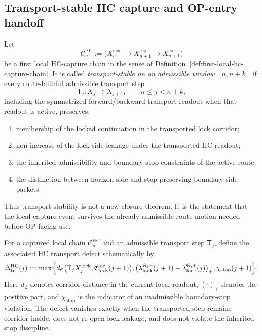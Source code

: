 \subsection{Transport-stable HC capture and OP-entry handoff}
\label{subsec:transport-stable-hc-capture-op-entry-handoff}

\begin{definition}
\label{def:transport-stable-hc-capture-chain}
Let
\[
  \mathcal C_{n}^{\mathrm{HC}}
  :=
  \bigl(
    X_n^{\mathrm{near}}
    \to
    X_{n+1}^{\mathrm{rep}}
    \to
    X_{n+1}^{\mathrm{lock}}
  \bigr)
\]
be a first local HC-capture chain in the sense of Definition~\ref{def:first-local-hc-capture-chain}.  It is called
\emph{transport-stable on an admissible window} $[n,n+k]$ if every route-faithful admissible transport step
\[
  \mathsf T_j:X_j\longmapsto X_{j+1},
  \qquad n\leq j<n+k,
\]
including the symmetrized forward/backward transport readout when that readout is active, preserves:
\begin{enumerate}[leftmargin=2em,label=(\alph*)]
  \item membership of the locked continuation in the transported lock corridor;
  \item non-increase of the lock-side leakage under the transported HC readout;
  \item the inherited admissibility and boundary-stop constraints of the active route;
  \item the distinction between horizon-side and stop-preserving boundary-side packets.
\end{enumerate}
Thus transport-stability is not a new closure theorem.  It is the statement that the local capture event survives the already-admissible route motion needed before OP-facing use.
\end{definition}

\begin{definition}
\label{def:hc-transport-defect}
For a captured local chain $\mathcal C_n^{\mathrm{HC}}$ and an admissible transport step $\mathsf T_j$, define the associated HC transport defect schematically by
\[
  \Delta_{\mathrm{tr}}^{\mathrm{HC}}(j)
  :=
  \max\Bigl\{
    d_{\mathfrak C}\bigl(\mathsf T_j X_{j}^{\mathrm{lock}},\mathfrak C_{\mathrm{lock}}^{\mathrm{loc}}(j+1)\bigr),
    \bigl(\lambda_{\mathrm{lock}}^{\Theta,+}(j+1)-\lambda_{\mathrm{lock}}^{\Theta,+}(j)\bigr)_{+},
    \chi_{\mathrm{stop}}(j+1)
  \Bigr\}.
\]
Here $d_{\mathfrak C}$ denotes corridor distance in the current local readout, $(\cdot)_+$ denotes the positive part, and $\chi_{\mathrm{stop}}$ is the indicator of an inadmissible boundary-stop violation.  The defect vanishes exactly when the transported step remains corridor-inside, does not re-open lock leakage, and does not violate the inherited stop discipline.
\end{definition}

